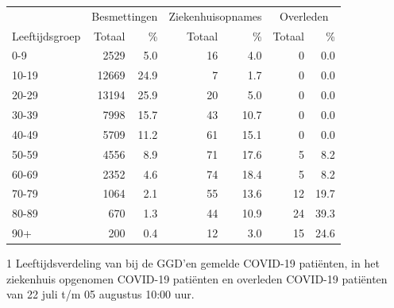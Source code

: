 \documentclass[
  english,
  man,floatsintext]{apa6}
\begin{document}
\begin{table}
\centering\begingroup\fontsize{11}{13}\selectfont

\begin{threeparttable}
\begin{tabular}{lrrrrrr}
\toprule
\multicolumn{1}{c}{ } & \multicolumn{2}{c}{Besmettingen} & \multicolumn{2}{c}{Ziekenhuisopnames} & \multicolumn{2}{c}{Overleden} \\
\cmidrule(l{3pt}r{3pt}){2-3} \cmidrule(l{3pt}r{3pt}){4-5} \cmidrule(l{3pt}r{3pt}){6-7}
Leeftijdsgroep & Totaal & \% & Totaal & \% & Totaal & \%\\
\midrule
0-9 & 2529 & 5.0 & 16 & 4.0 & 0 & 0.0\\
10-19 & 12669 & 24.9 & 7 & 1.7 & 0 & 0.0\\
20-29 & 13194 & 25.9 & 20 & 5.0 & 0 & 0.0\\
30-39 & 7998 & 15.7 & 43 & 10.7 & 0 & 0.0\\
40-49 & 5709 & 11.2 & 61 & 15.1 & 0 & 0.0\\
50-59 & 4556 & 8.9 & 71 & 17.6 & 5 & 8.2\\
60-69 & 2352 & 4.6 & 74 & 18.4 & 5 & 8.2\\
70-79 & 1064 & 2.1 & 55 & 13.6 & 12 & 19.7\\
80-89 & 670 & 1.3 & 44 & 10.9 & 24 & 39.3\\
90+ & 200 & 0.4 & 12 & 3.0 & 15 & 24.6\\
\bottomrule
\end{tabular}
\begin{tablenotes}
\item[1] Leeftijdsverdeling van bij de GGD’en gemelde COVID-19 patiënten, in het ziekenhuis opgenomen COVID-19 patiënten en overleden COVID-19 patiënten van 22 juli t/m 05 augustus 10:00 uur.
\end{tablenotes}
\end{threeparttable}
\endgroup{}
\end{table}

\newpage
\end{document}
